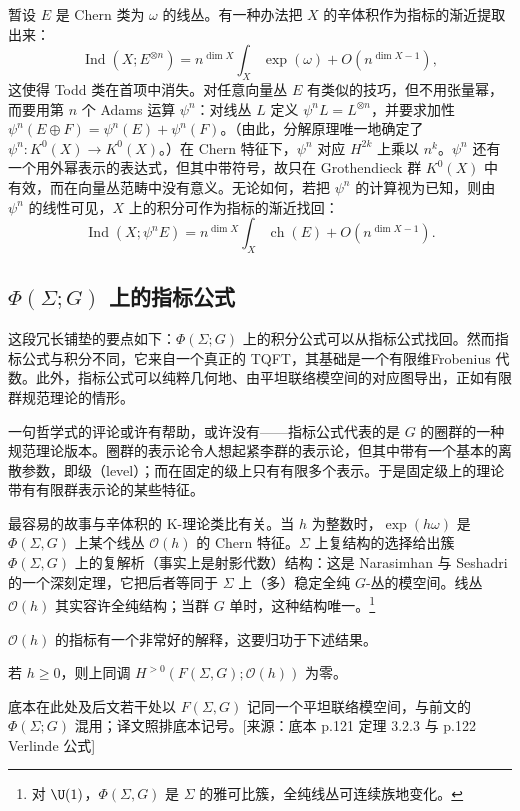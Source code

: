 暂设 $E$ 是 Chern 类为 $\omega$ 的线丛。有一种办法把 $X$ 的辛体积作为指标的渐近提取出来：
\[
\operatorname{Ind}(X;E^{\otimes n})=n^{\dim X}\int_X\exp(\omega)+O(n^{\dim X-1}),
\]
这使得 Todd 类在首项中消失。对任意向量丛 $E$ 有类似的技巧，但不用张量幂，而要用第 $n$ 个 Adams 运算 $\psi^n$：对线丛 $L$ 定义 $\psi^nL=L^{\otimes n}$，并要求加性 $\psi^n(E\oplus F)=\psi^n(E)+\psi^n(F)$。（由此，分解原理唯一地确定了 $\psi^n\colon K^0(X)\to K^0(X)$。）在 Chern 特征下，$\psi^n$ 对应 $H^{2k}$ 上乘以 $n^k$。$\psi^n$ 还有一个用外幂表示的表达式，但其中带符号，故只在 Grothendieck 群 $K^0(X)$ 中有效，而在向量丛范畴中没有意义。无论如何，若把 $\psi^n$ 的计算视为已知，则由 $\psi^n$ 的线性可见，$X$ 上的积分可作为指标的渐近找回：
\[
\operatorname{Ind}(X;\psi^nE)=n^{\dim X}\int_X\operatorname{ch}(E)+O(n^{\dim X-1}).
\]

\subsection{$\Phi(\Sigma;G)$ 上的指标公式}

这段冗长铺垫的要点如下：$\Phi(\Sigma;G)$ 上的积分公式可以从指标公式找回。然而指标公式与积分不同，它来自一个真正的 TQFT，其基础是一个有限维Frobenius 代数。此外，指标公式可以纯粹几何地、由平坦联络模空间的对应图导出，正如有限群规范理论的情形。

一句哲学式的评论或许有帮助，或许没有——指标公式代表的是 $G$ 的圈群的一种规范理论版本。圈群的表示论令人想起紧李群的表示论，但其中带有一个基本的离散参数，即级（level）；而在固定的级上只有有限多个表示。于是固定级上的理论带有有限群表示论的某些特征。

最容易的故事与辛体积的 K-理论类比有关。当 $h$ 为整数时，$\exp(h\omega)$ 是 $\Phi(\Sigma,G)$ 上某个线丛 $\mathcal{O}(h)$ 的 Chern 特征。$\Sigma$ 上复结构的选择给出簇 $\Phi(\Sigma,G)$ 上的复解析（事实上是射影代数）结构：这是 Narasimhan 与 Seshadri 的一个深刻定理，它把后者等同于 $\Sigma$ 上（多）稳定全纯 $G$-丛的模空间。线丛 $\mathcal{O}(h)$ 其实容许全纯结构；当群 $G$ 单时，这种结构唯一。\footnote{对 $\U(1)$，$\Phi(\Sigma,G)$ 是 $\Sigma$ 的雅可比簇，全纯线丛可连续族地变化。}

$\mathcal{O}(h)$ 的指标有一个非常好的解释，这要归功于下述结果。

\begin{theorem}
若 $h\ge0$，则上同调 $H^{>0}(F(\Sigma,G);\mathcal{O}(h))$ 为零。
\end{theorem}

\begin{annote}
底本在此处及后文若干处以 $F(\Sigma,G)$ 记同一个平坦联络模空间，与前文的 $\Phi(\Sigma;G)$ 混用；译文照排底本记号。[来源：底本 p.121 定理 3.2.3 与 p.122 Verlinde 公式]
\end{annote}

